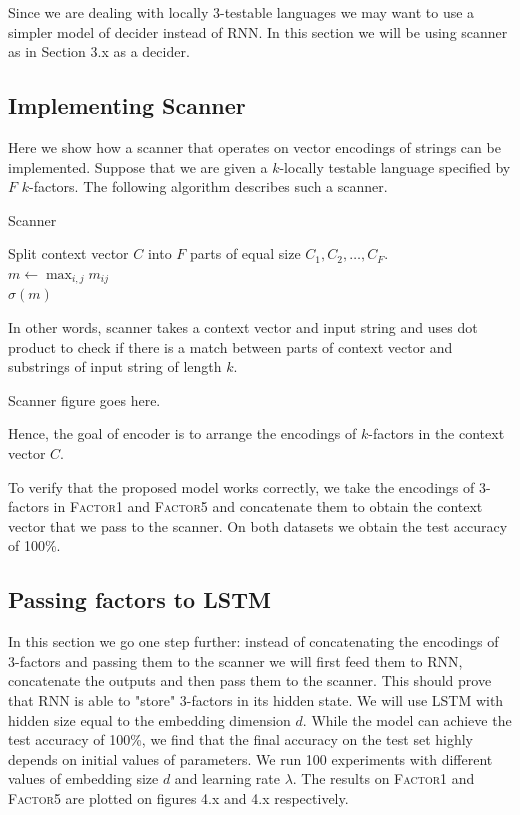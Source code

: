 \documentclass[titlepage]{report}
\begin{document}
Since we are dealing with locally 3-testable languages we may want to use a simpler model of decider instead of RNN. In this section we will be using scanner as in Section 3.x as a decider.

\subsection{Implementing Scanner}

Here we show how a scanner that operates on vector encodings of strings can be implemented. Suppose that we are given a $k$-locally testable language specified by $F$ $k$-factors. The following algorithm describes such a scanner.

\normalem
\begin{algorithm}
\caption{Scanner}
Split context vector $C$ into $F$ parts of equal size $C_1, C_2, \ldots, C_F$. \\
$m \leftarrow \max_{i, j} m_{ij}$ \\
\Return $\sigma(m)$
\end{algorithm}
\ULforem

\noindent
In other words, scanner takes a context vector and input string and uses dot product to check if there is a match between parts of context vector and substrings of input string of length $k$.

\begin{center}
Scanner figure goes here.
\end{center}

\noindent
Hence, the goal of encoder is to arrange the encodings of $k$-factors in the context vector $C$.

To verify that the proposed model works correctly, we take the encodings of 3-factors in \textsc{Factor1} and \textsc{Factor5} and concatenate them to obtain the context vector that we pass to the scanner. On both datasets we obtain the test accuracy of 100\%.

\subsection{Passing factors to LSTM}

In this section we go one step further: instead of concatenating the encodings of 3-factors and passing them to the scanner we will first feed them to RNN, concatenate the outputs and then pass them to the scanner. This should prove that RNN is able to "store" 3-factors in its hidden state. We will use LSTM with hidden size equal to the embedding dimension $d$. While the model can achieve the test accuracy of 100\%, we find that the final accuracy on the test set highly depends on initial values of parameters. We run 100 experiments with different values of embedding size $d$ and learning rate $\lambda$. The results on \textsc{Factor1} and \textsc{Factor5} are plotted on figures 4.x and 4.x respectively.
\end{document}
